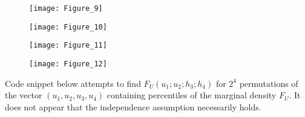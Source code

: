 \documentclass{article}
\begin{document}
\begin{figure}[h]
  \centering
    \texttt{[image: Figure\_9]}
\end{figure}
\FloatBarrier

\begin{figure}[h]
  \centering
    \texttt{[image: Figure\_10]}
\end{figure}
\FloatBarrier

\begin{figure}[h]
  \centering
    \texttt{[image: Figure\_11]}
\end{figure}
\FloatBarrier

\begin{figure}[h]
  \centering
    \texttt{[image: Figure\_12]}
\end{figure}
\FloatBarrier

Code snippet below attempts to find $F_U(u_1;u_2;h_3;h_4)$ for $2^4$ permutations of the vector $(u_1, u_2, u_3, u_4)$ containing percentiles of the marginal density $F_U$. It does not appear that the independence assumption necessarily holds.
\end{document}
